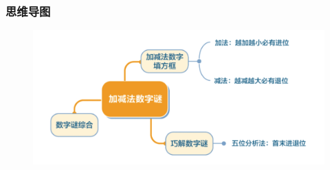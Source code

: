 \begin{frame}
    \frametitle{思维导图}
    \begin{figure}[H] 
        \centering
        \includegraphics[width=1\textwidth]{./pics/Chapter_3/siweidaotu.png}
    \end{figure}
\end{frame}